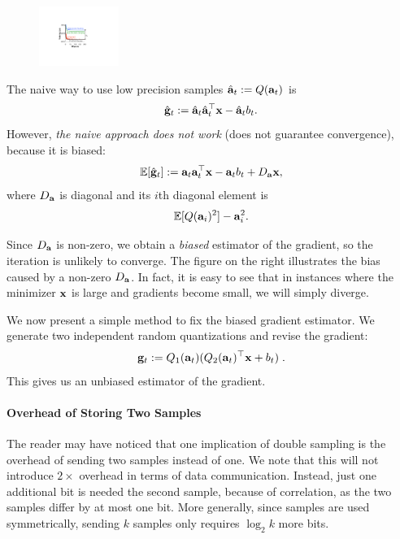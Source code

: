 \documentclass{article}
\def\a{{\bf a}}
\def\g{{\bf g}}
\def\x{{\bf x}}
\def\E{\mathbb{E}}
\begin{document}
\begin{figure}
  \begin{center}
    \includegraphics[width=0.23\textwidth]{micro-experiments/gap.pdf}
  \end{center}
  \label{fig:gap}
\end{figure}
The naive way to use low precision samples $\hat{\a}_t := Q(\a_t)$ is 
\[
\hat{\g}_t := \hat{\a}_t \hat{\a}_t^\top \x - \hat{\a}_t b_t.
\]
However, \emph{the naive approach does not work} (does not guarantee convergence), because it is biased: 
\[
\E[\hat{\g}_t] := \a_t \a_t^\top \x - \a_t b_t + D_{\a} \x, 
\]
where $D_{\a}$ is diagonal and its $i$th diagonal element is 
\[
\E[ Q(\a_i)^2 ] - \a_i^2.
\]

\vspace{-0.5em}
Since $D_{\a}$ is non-zero, we obtain a \emph{biased} estimator of the gradient, so the iteration is unlikely to converge. 
The figure on the right illustrates the bias caused by a non-zero $D_{\a}$. In fact, it is easy to see that in instances where the minimizer $\x$ is large and gradients become small, we will simply diverge. 

We now present a simple method to fix the biased gradient estimator. We generate two independent random quantizations and revise the gradient:
\begin{align}
\g_t := Q_1 (\a_t) (Q_2 (\a_t)^\top \x + b_t) \; .
\label{eq:double}
\end{align}
This gives us an unbiased estimator of the gradient. 

\paragraph*{Overhead of Storing Two Samples}
The reader may have noticed that one implication of double sampling is the overhead of sending
two samples instead of one. We note that this will not introduce $2\times$
overhead in terms of data communication. Instead, just one additional bit
is needed the second sample, because of correlation, as the two samples 
differ by at most one bit. More generally, since samples
are used symmetrically, sending $k$ samples only requires $\log_2 k$ more bits.

\vspace{-0.5em}
\end{document}
